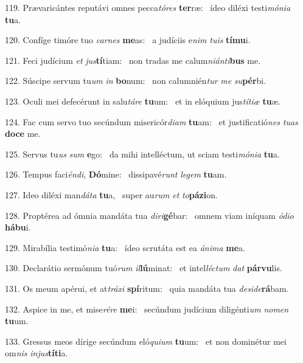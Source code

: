 119. Prævaricántes reputávi omnes pecca\textit{tó}\textit{res} \textbf{ter}ræ: \ast\  ídeo diléxi testi\textit{mó}\textit{ni}\textit{a} \textbf{tu}a.\

120. Confíge timóre tuo \textit{car}\textit{nes} \textbf{me}as: \ast\  a judíciis e\textit{nim} \textit{tu}\textit{is} \textbf{tí}\textbf{mu}i.\

121. Feci judícium \textit{et} \textit{jus}\textbf{tí}tiam: \ast\  non tradas me calum\textit{ni}\textit{án}\textit{ti}\textbf{bus} me.\

122. Súscipe servum tu\textit{um} \textit{in} \textbf{bo}num: \ast\  non calumnién\textit{tur} \textit{me} \textit{su}\textbf{pér}bi.\

123. Oculi mei defecérunt in salu\textit{tá}\textit{re} \textbf{tu}um: \ast\  et in elóquium jus\textit{tí}\textit{ti}\textit{æ} \textbf{tu}æ.\

124. Fac cum servo tuo secúndum misericór\textit{di}\textit{am} \textbf{tu}am: \ast\  et justificatió\textit{nes} \textit{tu}\textit{as} \textbf{do}\textbf{ce} me.\

125. Servus tu\textit{us} \textit{sum} \textbf{e}go: \ast\  da mihi intelléctum, ut sciam testi\textit{mó}\textit{ni}\textit{a} \textbf{tu}a.\

126. Tempus faci\textit{én}\textit{di}, \textbf{Dó}mine: \ast\  dissipavé\textit{runt} \textit{le}\textit{gem} \textbf{tu}am.\

127. Ideo diléxi man\textit{dá}\textit{ta} \textbf{tu}a, \ast\  super au\textit{rum} \textit{et} \textit{to}\textbf{pá}\textbf{zi}on.\

128. Proptérea ad ómnia mandáta tua \textit{di}\textit{ri}\textbf{gé}bar: \ast\  omnem viam iníquam \textit{ó}\textit{di}\textit{o} \textbf{há}\textbf{bu}i.\

129. Mirabília testimó\textit{ni}\textit{a} \textbf{tu}a: \ast\  ídeo scrutáta est ea \textit{á}\textit{ni}\textit{ma} \textbf{me}a.\

130. Declarátio sermónum tuó\textit{rum} \textit{il}\textbf{lú}minat: \ast\  et intel\textit{léc}\textit{tum} \textit{dat} \textbf{pár}\textbf{vu}lis.\

131. Os meum apérui, et at\textit{trá}\textit{xi} \textbf{spí}ritum: \ast\  quia mandáta tua \textit{de}\textit{si}\textit{de}\textbf{rá}bam.\

132. Aspice in me, et mise\textit{ré}\textit{re} \textbf{me}i: \ast\  secúndum judícium diligénti\textit{um} \textit{no}\textit{men} \textbf{tu}um.\

133. Gressus meos dírige secúndum eló\textit{qui}\textit{um} \textbf{tu}um: \ast\  et non dominétur mei om\textit{nis} \textit{in}\textit{jus}\textbf{tí}\textbf{ti}a.\

